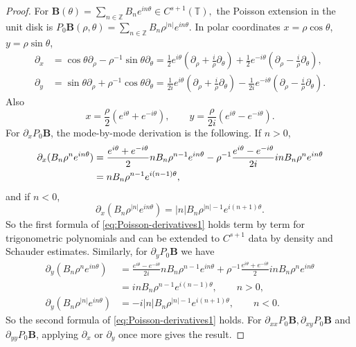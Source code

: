 \documentclass[12pt,reqno]{amsart}
\numberwithin{equation}{section}
\theoremstyle{definition}
\theoremstyle{remark}
\begin{document}
\begin{proof}
For $ \textbf{B}(\theta)=\sum_{n\in\mathbb Z}B_ne^{in\theta}\in C^{s+1}(\mathbb T), $
the Poisson extension in the unit disk is $ P_0\textbf{B}(\rho,\theta)=\sum_{n\in\mathbb Z}B_n\rho^{|n|}e^{in\theta}. $
In polar coordinates $x=\rho\cos\theta$, $y=\rho\sin\theta$,
\begin{equation*}\label{eq:px-polar}
\begin{split}
\partial_x&=\cos\theta\partial_\rho-\rho^{-1}\sin\theta\partial_\theta
=\frac12e^{i\theta}\left(\partial_\rho+\frac i\rho\partial_\theta\right)
+\frac12e^{-i\theta}\left(\partial_\rho-\frac i\rho\partial_\theta\right),\\
\partial_y&=\sin\theta\partial_\rho+\rho^{-1}\cos\theta\partial_\theta
=\frac1{2i}e^{i\theta}\left(\partial_\rho+\frac i\rho\partial_\theta\right)
-\frac1{2i}e^{-i\theta}\left(\partial_\rho-\frac i\rho\partial_\theta\right). 
\end{split}
\end{equation*}
Also
\begin{equation*}\label{eq:x-y-Fourier}
x=\frac\rho2(e^{i\theta}+e^{-i\theta}),
\qquad y=\frac\rho{2i}(e^{i\theta}-e^{-i\theta}).
\end{equation*}
For $ \partial_xP_0\textbf{B} $, the mode-by-mode derivation is the following.  If $n>0$,
\begin{align*}\label{eq:px-mode-positive-full}
\partial_x(B_n\rho^ne^{in\theta})
&=\frac{e^{i\theta}+e^{-i\theta}}{2}nB_n\rho^{n-1}e^{in\theta}
-\rho^{-1}\frac{e^{i\theta}-e^{-i\theta}}{2i}inB_n\rho^ne^{in\theta}\notag\\
&=nB_n\rho^{n-1}e^{i(n-1)\theta},
\end{align*}
and if $n<0$,
\begin{equation*}\label{eq:px-mode-negative-full}
\partial_x(B_n\rho^{|n|}e^{in\theta})=|n|B_n\rho^{|n|-1}e^{i(n+1)\theta}.
\end{equation*}
So the first formula of \eqref{eq:Poisson-derivatives1} holds term by term for trigonometric polynomials and can be extended to $C^{s+1}$ data by density and  Schauder estimates. Similarly, for $ \partial_yP_0\textbf{B} $ we have
\begin{equation*}\label{eq:py-mode-positive-full}
\begin{split}
\partial_y(B_n\rho^ne^{in\theta})&=\frac{e^{i\theta}-e^{-i\theta}}{2i}nB_n\rho^{n-1}e^{in\theta}
+\rho^{-1}\frac{e^{i\theta}+e^{-i\theta}}{2}inB_n\rho^ne^{in\theta} \\
&=inB_n\rho^{n-1}e^{i(n-1)\theta},\qquad n>0,\\
\partial_y(B_n\rho^{|n|}e^{in\theta})&=-i|n|B_n\rho^{|n|-1}e^{i(n+1)\theta},\qquad n<0. 
\end{split}
\end{equation*}
So the second formula of \eqref{eq:Poisson-derivatives1} holds. For $ \partial_{xx}P_0\textbf{B},\partial_{xy}P_0\textbf{B}$ and $ \partial_{yy}P_0\textbf{B} $, applying $\partial_x$ or $\partial_y$ once more gives the result.  

\end{proof}
\end{document}
